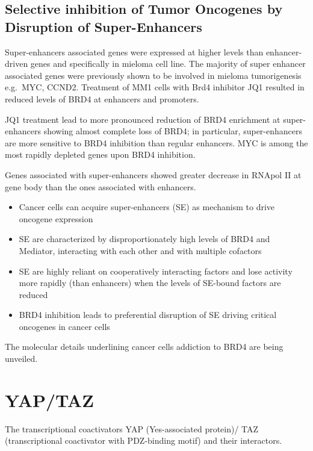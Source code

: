 \hypertarget{selective-inhibition-of-tumor-oncogenes-by-disruption-of-super-enhancers}{%
\subsection{Selective inhibition of Tumor Oncogenes by Disruption of Super-Enhancers}\label{selective-inhibition-of-tumor-oncogenes-by-disruption-of-super-enhancers}}

Super-enhancers associated genes were expressed at higher levels than enhancer-driven genes and specifically in mieloma cell line. The majority of super enhancer associated genes were previously shown to be involved in mieloma tumorigenesis e.g.~MYC, CCND2. Treatment of MM1 cells with Brd4 inhibitor JQ1 resulted in reduced levels of BRD4 at enhancers and promoters.

JQ1 treatment lead to more pronounced reduction of BRD4 enrichment at super- enhancers showing almost complete loss of BRD4; in particular, super-enhancers are more sensitive to BRD4 inhibition than regular enhancers. MYC is among the most rapidly depleted genes upon BRD4 inhibition.

Genes associated with super-enhancers showed greater decrease in RNApol II at gene body than the ones associated with enhancers.

\begin{itemize}
\tightlist
\item
  Cancer cells can acquire super-enhancers (SE) as mechanism to drive oncogene expression
\item
  SE are characterized by disproportionately high levels of BRD4 and Mediator, interacting with each other and with multiple cofactors
\item
  SE are highly reliant on cooperatively interacting factors and lose activity more rapidly (than enhancers) when the levels of SE-bound factors are reduced
\item
  BRD4 inhibition leads to preferential disruption of SE driving critical oncogenes in cancer cells
\end{itemize}

The molecular details underlining cancer cells addiction to BRD4 are being unveiled.

\hypertarget{yaptaz}{%
\section{YAP/TAZ}\label{yaptaz}}

The transcriptional coactivators YAP (Yes-associated protein)/ TAZ (transcriptional coactivator with PDZ-binding motif) and their interactors.

